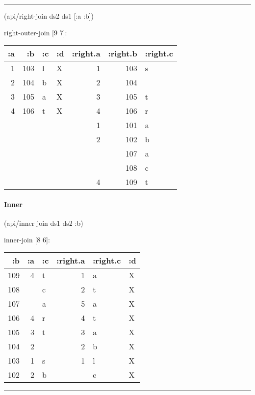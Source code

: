 \documentclass[]{article}
\newenvironment{Shaded}{\begin{snugshade}}{\end{snugshade}}
\newcommand{\AttributeTok}[1]{\textcolor[rgb]{0.77,0.63,0.00}{#1}}
\newcommand{\NormalTok}[1]{#1}
\let\oldparagraph\paragraph
\renewcommand{\paragraph}[1]{\oldparagraph{#1}\mbox{}}
\begin{document}
\begin{center}\rule{0.5\linewidth}{0.5pt}\end{center}

\begin{Shaded}
\begin{Highlighting}[]
\NormalTok{(api/right-join ds2 ds1 [}\AttributeTok{:a} \AttributeTok{:b}\NormalTok{])}
\end{Highlighting}
\end{Shaded}

right-outer-join {[}9 7{]}:

\begin{longtable}[]{@{}rrllrrl@{}}
\toprule
:a & :b & :c & :d & :right.a & :right.b & :right.c\tabularnewline
\midrule
\endhead
1 & 103 & l & X & 1 & 103 & s\tabularnewline
2 & 104 & b & X & 2 & 104 &\tabularnewline
3 & 105 & a & X & 3 & 105 & t\tabularnewline
4 & 106 & t & X & 4 & 106 & r\tabularnewline
& & & & 1 & 101 & a\tabularnewline
& & & & 2 & 102 & b\tabularnewline
& & & & & 107 & a\tabularnewline
& & & & & 108 & c\tabularnewline
& & & & 4 & 109 & t\tabularnewline
\bottomrule
\end{longtable}

\paragraph{Inner}\label{inner}

\begin{Shaded}
\begin{Highlighting}[]
\NormalTok{(api/inner-join ds1 ds2 }\AttributeTok{:b}\NormalTok{)}
\end{Highlighting}
\end{Shaded}

inner-join {[}8 6{]}:

\begin{longtable}[]{@{}rrlrll@{}}
\toprule
:b & :a & :c & :right.a & :right.c & :d\tabularnewline
\midrule
\endhead
109 & 4 & t & 1 & a & X\tabularnewline
108 & & c & 2 & t & X\tabularnewline
107 & & a & 5 & a & X\tabularnewline
106 & 4 & r & 4 & t & X\tabularnewline
105 & 3 & t & 3 & a & X\tabularnewline
104 & 2 & & 2 & b & X\tabularnewline
103 & 1 & s & 1 & l & X\tabularnewline
102 & 2 & b & & e & X\tabularnewline
\bottomrule
\end{longtable}

\begin{center}\rule{0.5\linewidth}{0.5pt}\end{center}
\end{document}
